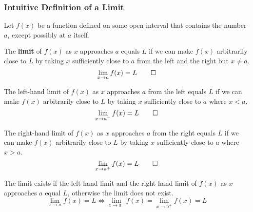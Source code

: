 \subsubsection*{Intuitive Definition of a Limit}
Let \(f(x)\) be a function defined on some open interval that contains the
number \(a\), except possibly at \(a\) itself.
\begin{definition}
    The \textbf{limit} of \(f(x)\) as \(x\) approaches \(a\) equals \(L\) if
    we can make \(f(x)\) arbitrarily close to \(L\) by taking \(x\)
    sufficiently close to \(a\) from the left and the right but \(x\neq a\).
    \[\lim_{x\to a}f(x)=L\qedhere\]
\end{definition}
\begin{definition}
    The left-hand limit of \(f(x)\) as \(x\) approaches \(a\) from the left
    equals \(L\) if we can make \(f(x)\) arbitrarily close to \(L\) by taking
    \(x\) sufficiently close to \(a\) where \(x<a\).
    \[\lim_{x\to a^-}f(x)=L\qedhere\]
\end{definition}
\begin{definition}
    The right-hand limit of \(f(x)\) as \(x\) approaches \(a\) from the right
    equals \(L\) if we can make \(f(x)\) arbitrarily close to \(L\) by taking
    \(x\) sufficiently close to \(a\) where \(x>a\).
    \[\lim_{x\to a^+}f(x)=L\qedhere\]
\end{definition}
The limit exists if the left-hand limit and the right-hand limit of \(f(x)\)
as \(x\) approaches \(a\) equal \(L\), otherwise the limit does not exist.
\[\lim_{x\to a}f(x)=L\iff\lim_{x\to a^-}f(x)=\lim_{x\to a^+}f(x)=L\]